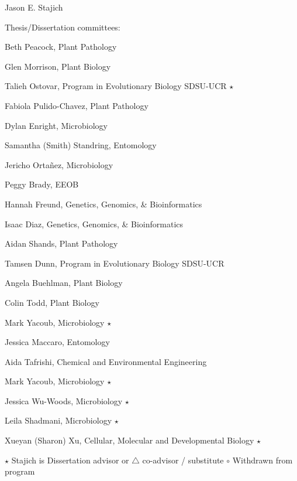 \documentclass[10pt]{article}
\begin{document}
\begin{cv}{\centerline{Jason E. Stajich}}
\begin{cvlistcompact}{Thesis/Dissertation committees:}
\item Beth Peacock, Plant Pathology
\item Glen Morrison, Plant Biology
\item Talieh Ostovar, Program in Evolutionary Biology SDSU-UCR $\star$
\item Fabiola Pulido-Chavez, Plant Pathology
\item Dylan Enright, Microbiology
\item Samantha (Smith) Standring, Entomology
\item Jericho Orta\~{n}ez, Microbiology
\item Peggy Brady, EEOB
\item Hannah Freund, Genetics, Genomics, \& Bioinformatics
\item Isaac Diaz, Genetics, Genomics, \& Bioinformatics
\item Aidan Shands, Plant Pathology
\item Tamsen Dunn, Program in Evolutionary Biology SDSU-UCR
\item Angela Buehlman, Plant Biology
\item Colin Todd, Plant Biology
\item Mark Yacoub, Microbiology $\star$
\item Jessica Maccaro, Entomology
\item Aida Tafrishi, Chemical and Environmental Engineering
\item Mark Yacoub, Microbiology $\star$
\item Jessica Wu-Woods, Microbiology $\star$
\item Leila Shadmani, Microbiology $\star$
\item Xueyan (Sharon) Xu, Cellular, Molecular and Developmental Biology $\star$

\end{cvlistcompact}
$\star$ Stajich is Dissertation advisor or $\triangle$ co-advisor / substitute
$\circ$ Withdrawn from program


\end{cv}
\end{document}
